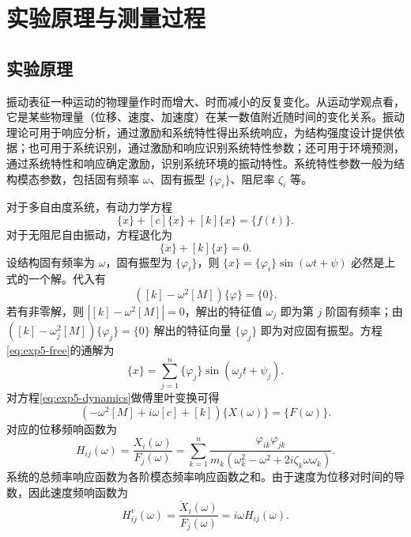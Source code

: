 \documentclass[UTF8,a4paper,12pt]{ctexart}
\numberwithin{equation}{section}
\begin{document}
\section{实验原理与测量过程}
\subsection{实验原理}
振动表征一种运动的物理量作时而增大、时而减小的反复变化。从运动学观点看，它是某些物理量（位移、速度、加速度）在某一数值附近随时间的变化关系。振动理论可用于响应分析，通过激励和系统特性得出系统响应，为结构强度设计提供依据；也可用于系统识别，通过激励和响应识别系统特性参数；还可用于环境预测，通过系统特性和响应确定激励，识别系统环境的振动特性。系统特性参数一般为结构模态参数，包括固有频率 $\omega$、固有振型 $\{\varphi_i\}$、阻尼率 $\zeta_i$ 等。

对于多自由度系统，有动力学方程
\begin{equation}
  [M]\{\ddot{x}\}+[c]\{\dot{x}\}+[k]\{x\}=\{f(t)\}.
  \label{eq:exp5-dynamics}
\end{equation}
对于无阻尼自由振动，方程退化为
\begin{equation}
  [M]\{\ddot{x}\}+[k]\{x\}=0.
  \label{eq:exp5-free}
\end{equation}
设结构固有频率为 $\omega$，固有振型为 $\{\varphi_i\}$，则 $\{x\}=\{\varphi_i\}\sin(\omega t+\psi)$ 必然是上式的一个解。代入有
\begin{equation}
  ([k]-\omega^2[M])\{\varphi\}=\{0\}.
\end{equation}
若有非零解，则 $|[k]-\omega^2[M]|=0$，解出的特征值 $\omega_j$ 即为第 $j$ 阶固有频率；由 $([k]-\omega_j^2[M])\{\varphi_j\}=\{0\}$ 解出的特征向量 $\{\varphi_j\}$ 即为对应固有振型。方程\eqref{eq:exp5-free}的通解为
\begin{equation}
  \{x\}=\sum_{j=1}^{n}\{\varphi_j\}\sin(\omega_jt+\psi_j).
\end{equation}
对方程\eqref{eq:exp5-dynamics}做傅里叶变换可得
\begin{equation}
  (-\omega^2[M]+i\omega[c]+[k])\{X(\omega)\}=\{F(\omega)\}.
\end{equation}
对应的位移频响函数为
\begin{equation}
  H_{ij}(\omega)=\frac{X_i(\omega)}{F_j(\omega)}
  =\sum_{k=1}^{n}\frac{\varphi_{ik}\varphi_{jk}}
  {m_k(\omega_k^2-\omega^2+2i\zeta_k\omega\omega_k)}.
\end{equation}
系统的总频率响应函数为各阶模态频率响应函数之和。由于速度为位移对时间的导数，因此速度频响函数为
\begin{equation}
  H^v_{ij}(\omega)=\frac{\dot{X}_i(\omega)}{F_j(\omega)}=i\omega H_{ij}(\omega).
\end{equation}
\end{document}
